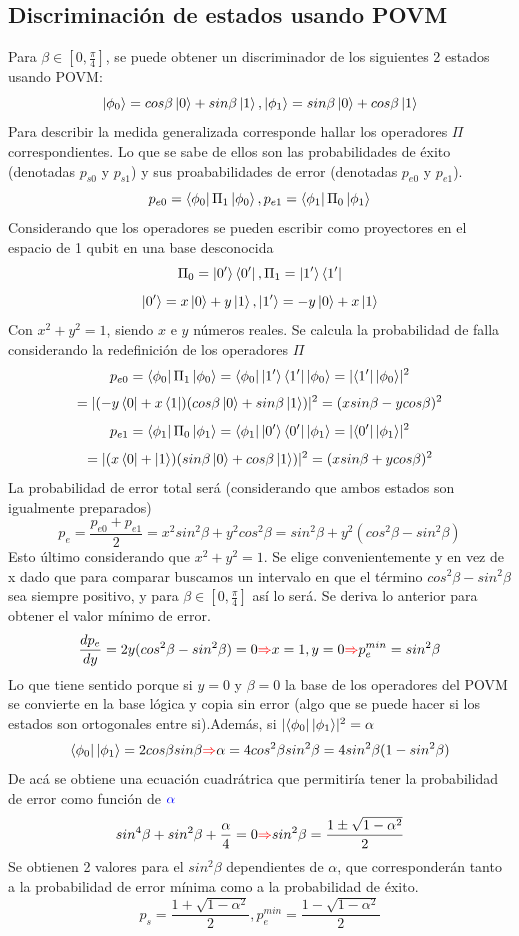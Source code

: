 \documentclass{book}
\begin{document}
\subsection{Discriminación de estados usando POVM} Para $\beta\in[0,\frac{\pi}{4}]$, se puede obtener un discriminador de los siguientes 2 estados usando POVM:
$$\ket{\phi_0}=cos\beta\ket{0}+sin\beta\ket{1}, \ket{\phi_1}=sin\beta\ket{0}+cos\beta\ket{1}$$
Para describir la medida generalizada corresponde hallar los operadores $\Pi$ correspondientes. Lo que se sabe de ellos son las probabilidades de éxito (denotadas $p_{s0}$ y $p_{s1}$) y sus proababilidades de error (denotadas $p_{e0}$ y $p_{e1}$).  
$$ p_{e0}=\bra{\phi_0}\Pi_1\ket{\phi_0}, p_{e1}=\bra{\phi_1}\Pi_0\ket{\phi_1}$$
Considerando que los operadores se pueden escribir como proyectores en el espacio de 1 qubit en una base desconocida
$$\Pi_0=\ket{0^\prime}\bra{0^\prime},\Pi_1=\ket{1^\prime}\bra{1^\prime} $$
$$\ket{0^\prime}=x\ket{0}+y\ket{1}, \ket{1^\prime}=-y\ket{0}+x\ket{1} $$
Con $x^2+y^2=1$, siendo $x$ e $y$ números reales. Se calcula la probabilidad de falla considerando la redefinición de los operadores $\Pi$
$$p_{e0}=\bra{\phi_0}\Pi_1\ket{\phi_0}=\bra{\phi_0}\ket{1^\prime}\bra{1^\prime}\ket{\phi_0}=\lvert\bra{1^\prime}\ket{\phi_0}\rvert^2$$ $$=\lvert(-y\bra{0}+x\bra{1})(cos\beta\ket{0}+sin\beta\ket{1})\rvert^2=(xsin\beta-ycos\beta)^2$$
$$p_{e1}=\bra{\phi_1}\Pi_0\ket{\phi_1}=\bra{\phi_1}\ket{0^\prime}\bra{0^\prime}\ket{\phi_1}=\lvert\bra{0^\prime}\ket{\phi_1}\rvert^2$$ $$=\lvert(x\bra{0}+\ket{1})(sin\beta\ket{0}+cos\beta\ket{1})\rvert^2=(xsin\beta+ycos\beta)^2$$
La probabilidad de error total será (considerando que ambos estados son igualmente preparados)
$$p_e=\frac{p_{e0}+p_{e1}}{2}=x^2sin^2\beta+y^2cos^2 \beta=sin^2\beta+y^2(cos^2\beta-sin^2\beta)$$
Esto último considerando que $x^2+y^2=1$. Se elige convenientemente y en vez de x dado que para comparar buscamos un intervalo en que el término $cos^2\beta-sin^2\beta$ sea siempre positivo, y para $\beta\in[0,\frac{\pi}{4}]$ así lo será. Se deriva lo anterior para obtener el valor mínimo de error.
$$\frac{dp_e}{dy}=2y(cos^2\beta-sin^2\beta)=0\textcolor{red}{\Rightarrow} x=1,y=0 \textcolor{red}{\Rightarrow} p_e^{min}=sin^2\beta $$ Lo que tiene sentido porque si $y=0$ y $\beta=0$   la base de los operadores del POVM se convierte en la base lógica y copia sin error (algo que se puede hacer si los estados son ortogonales entre si).Además, si $\lvert\bra{\phi_0}\ket{\phi_1}\rvert^2=\alpha$
$$\bra{\phi_0}\ket{\phi_1}=2cos\beta sin\beta\textcolor{red}{\Rightarrow}\alpha=4cos^2\beta sin^2\beta=4sin^2\beta(1-sin^2\beta)$$ 
De acá se obtiene una ecuación cuadrátrica que permitiría tener la probabilidad de error como función de $\textcolor{blue}{\alpha}$
$$sin^4\beta+sin^2\beta+\frac{\alpha}{4}=0\textcolor{red}{\Rightarrow} sin^2\beta=\frac{1\pm\sqrt{1-\alpha^2}}{2}$$
Se obtienen 2 valores para el $sin^2\beta$ dependientes de $\alpha$, que corresponderán tanto a la probabilidad de error mínima como a la probabilidad de éxito.
$$p_s=\frac{1+\sqrt{1-\alpha^2}}{2}, p_e^{min}=\frac{1-\sqrt{1-\alpha^2}}{2}$$
\end{document}

